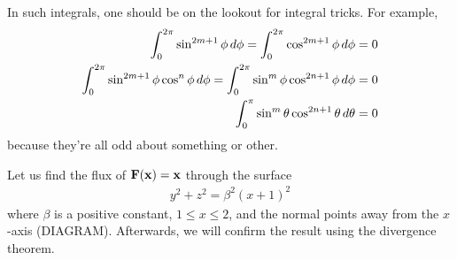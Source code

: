 \documentclass{../template/note}
\begin{document}
    \begin{remark*}
        In such integrals, one should be on the lookout for integral tricks. For example,
        \begin{align*}
            \int_0^{2\pi} \sin^{2m+1} \phi \,d{\phi} = \int_0^{2\pi} \cos^{2m+1} \phi \,d{\phi} &= 0 \\
            \int_0^{2\pi} \sin^{2m+1} \phi \cos^n \phi \,d{\phi} = \int_0^{2\pi} \sin^m \phi \cos^{2n+1} \phi \,d{\phi} &= 0 \\
            \int_0^{\pi} \sin^m \theta \cos^{2n+1} \theta \,d{\theta} &= 0
        \end{align*}
        because they're all odd about something or other.
    \end{remark*}
    
    \begin{example*}[hard]
        Let us find the flux of \(\V F(\V x) = \V x\) through the surface
        \begin{align*}
            y^2 + z^2 = \beta^2(x+1)^2
        \end{align*}
        where \(\beta\) is a positive constant, \(1 \leq x \leq 2\), and the normal points away from the \(x\)-axis (DIAGRAM). Afterwards, we will confirm the result using the divergence theorem.
        

\end{example*}
\end{document}
